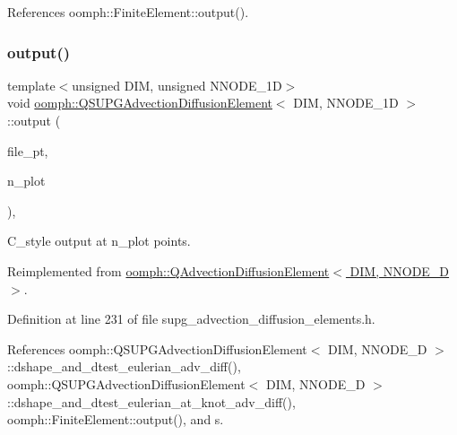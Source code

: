 References oomph\+::\+Finite\+Element\+::output().

\mbox{\label{classoomph_1_1QSUPGAdvectionDiffusionElement_ac567806bf5318e95b1517cb80e8a3b78}} 
\subsubsection{\texorpdfstring{output()}{output()}\hspace{0.1cm}{\footnotesize\ttfamily [4/4]}}
{\footnotesize\ttfamily template$<$unsigned D\+IM, unsigned N\+N\+O\+D\+E\+\_\+1D$>$ \\
void \hyperlink{classoomph_1_1QSUPGAdvectionDiffusionElement}{oomph\+::\+Q\+S\+U\+P\+G\+Advection\+Diffusion\+Element}$<$ D\+IM, N\+N\+O\+D\+E\+\_\+1D $>$\+::output (\begin{DoxyParamCaption}\item[{F\+I\+LE $\ast$}]{file\+\_\+pt,  }\item[{const unsigned \&}]{n\+\_\+plot }\end{DoxyParamCaption})\hspace{0.3cm}{\ttfamily [inline]}, {\ttfamily [virtual]}}



C\+\_\+style output at n\+\_\+plot points. 



Reimplemented from \hyperlink{classoomph_1_1QAdvectionDiffusionElement_a891cdaba60a0cd6b3438f161fb537933}{oomph\+::\+Q\+Advection\+Diffusion\+Element$<$ D\+I\+M, N\+N\+O\+D\+E\+\_\+D $>$}.



Definition at line 231 of file supg\+\_\+advection\+\_\+diffusion\+\_\+elements.\+h.



References oomph\+::\+Q\+S\+U\+P\+G\+Advection\+Diffusion\+Element$<$ D\+I\+M, N\+N\+O\+D\+E\+\_\+D $>$\+::dshape\+\_\+and\+\_\+dtest\+\_\+eulerian\+\_\+adv\+\_\+diff(), oomph\+::\+Q\+S\+U\+P\+G\+Advection\+Diffusion\+Element$<$ D\+I\+M, N\+N\+O\+D\+E\+\_\+D $>$\+::dshape\+\_\+and\+\_\+dtest\+\_\+eulerian\+\_\+at\+\_\+knot\+\_\+adv\+\_\+diff(), oomph\+::\+Finite\+Element\+::output(), and s.

